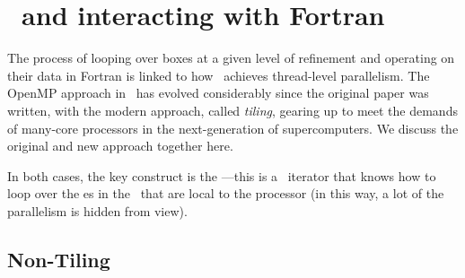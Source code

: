 \section{\mfiter\ and interacting with Fortran}

The process of looping over boxes at a given level of refinement and
operating on their data in Fortran is linked to how \castro\ achieves
thread-level parallelism.  The OpenMP approach in \castro\ has evolved
considerably since the original paper was written, with the modern
approach, called {\em tiling}, gearing up to meet the demands of
many-core processors in the next-generation of supercomputers.  We
discuss the original and new approach together here.

In both cases, the key construct is the \code{\mfiter}---this is a
\cpp\ iterator that knows how to loop over the \farraybox es in the
\multifab\ that are local to the processor (in this way, a lot of the
parallelism is hidden from view).

\subsection{Non-Tiling \mfiter}

